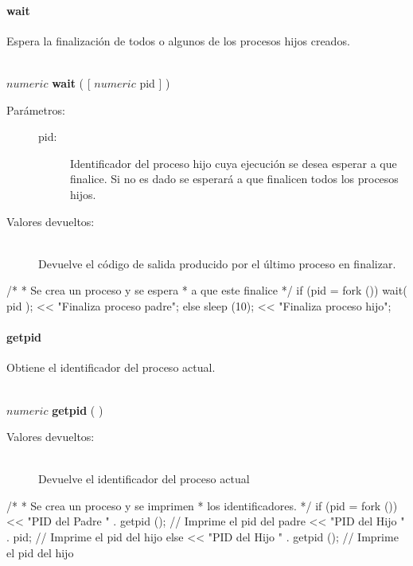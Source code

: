 \paragraph{wait}
Espera la finalización de todos o algunos de los procesos hijos creados.


\begin{framed}
\hfill \\ $numeric$ \textbf{wait} ( [ $numeric$ pid ] )  
\begin{description}
\item [Parámetros:] \hfill 
   \begin{description}
   \item[pid:] Identificador del proceso hijo cuya ejecución se desea esperar a que 
   finalice. Si no es dado se esperará a que finalicen todos los procesos hijos.
   \end{description}
\item[Valores devueltos:] \hfill \\
   Devuelve el código de salida producido por el último proceso en finalizar.
\end{description}
\end{framed}
     
\begin{myverbatim}  
   /*
    * Se crea un proceso y se espera
    * a que este finalice
    */
    if (pid = fork ()) {
      wait( pid );
      << "Finaliza proceso padre";
   }else{
      sleep (10);
      << "Finaliza proceso hijo";
   }
\end{myverbatim}

\paragraph{getpid}
Obtiene el identificador del proceso actual.


\begin{framed}
\hfill \\ $numeric$ \textbf{getpid} ( )  
\begin{description}
\item[Valores devueltos:] \hfill \\
   Devuelve el identificador del proceso actual
\end{description}
\end{framed}
     
\begin{myverbatim}  
   /*
    * Se crea un proceso y se imprimen
    * los identificadores.
    */
   if (pid = fork ()) {
      << "PID del Padre " . getpid (); // Imprime el pid del padre
      << "PID del Hijo " . pid; // Imprime el pid del hijo
   } else {
      << "PID del Hijo " . getpid (); // Imprime el pid del hijo
   }
\end{myverbatim}

